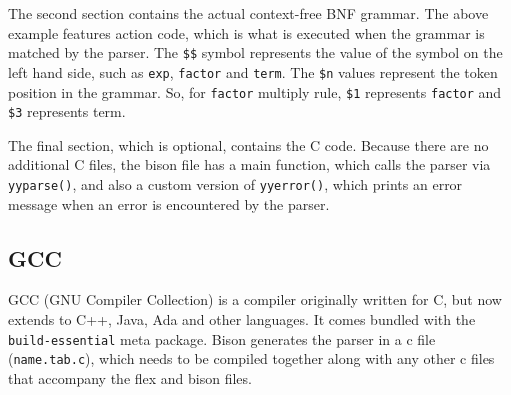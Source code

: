 \documentclass[12pt]{report}
\begin{document}
The second section contains the actual context-free BNF grammar.  The above example features action code, which is what is executed when the grammar is matched by the parser.  The \texttt{\$\$} symbol represents the value of the symbol on the left hand side, such as \texttt{exp}, \texttt{factor} and \texttt{term}.  The \texttt{\$n} values represent the token position in the grammar.  So, for \texttt{factor} multiply rule, \texttt{\$1} represents \texttt{factor} and \texttt{\$3} represents term.

The final section, which is optional, contains the C code.  Because there are no additional C files, the bison file has a main function, which calls the parser via \texttt{yyparse()}, and also a custom version of \texttt{yyerror()}, which prints an error message when an error is encountered by the parser.
\subsection{GCC}\label{fig:gcc}
GCC (GNU Compiler Collection) is a compiler originally written for C, but now extends to C++, Java, Ada and other languages.  It comes bundled with the \texttt{build-essential} meta package.  Bison generates the parser in a c file (\texttt{name.tab.c}), which needs to be compiled together along with any other c files that accompany the flex and bison files.
\end{document}
